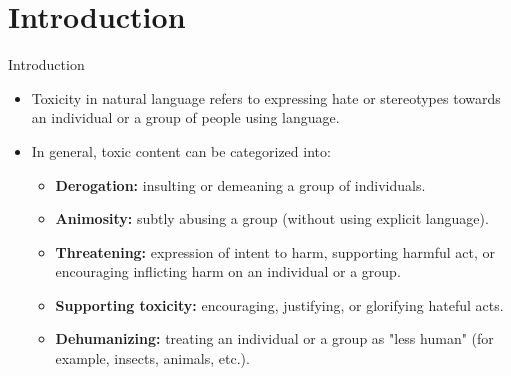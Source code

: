 \section{Introduction}

\begin{frame}{Introduction}




\begin{itemize}

    \item Toxicity in natural language refers to expressing hate or stereotypes towards an individual or a group of people using language.

    \item In general, toxic content can be categorized into:
    \begin{itemize}
        \item \textbf{Derogation:} insulting or demeaning a group of individuals.
        \item \textbf{Animosity:} subtly abusing a group (without using explicit language).
        \item \textbf{Threatening:} expression of intent to harm, supporting harmful act, or encouraging inflicting harm on an individual or a group.
        \item \textbf{Supporting toxicity:} encouraging, justifying, or glorifying hateful acts.
        \item \textbf{Dehumanizing:} treating an individual or a group as "less human" (for example, insects, animals, etc.).
    \end{itemize}

\end{itemize}

\end{frame}
